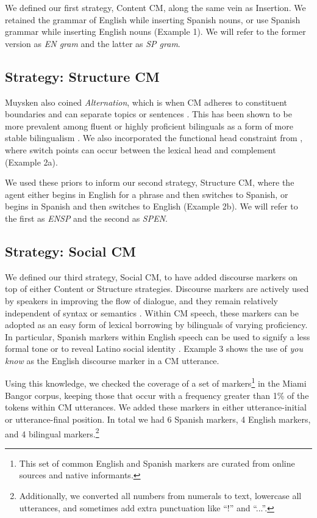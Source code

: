 \documentclass[11pt,a4paper]{article}
\begin{document}
We defined our first strategy, Content CM, along the same vein as Insertion.
We retained the grammar of English while inserting Spanish nouns, or use Spanish grammar while inserting English nouns (Example 1). 
We will refer to the former version as \textit{EN gram} and the latter as \textit{SP gram}.

\subsection{Strategy: Structure CM}

Muysken also coined \textit{Alternation}, which is when CM adheres to constituent boundaries \citep{sankoff1981formal} and can separate topics or sentences \citep{Ardila2005}. 
This has been shown to be more prevalent among fluent or highly proficient bilinguals as a form of more stable bilingualism \citep{Deuchar2007}. 
We also incorporated the functional head constraint from \citet{Belazi1994}, where switch points can occur between the lexical head and complement (Example 2a).

We used these priors to inform our second strategy, Structure CM, where the agent either begins in English for a phrase and then switches to Spanish, or begins in Spanish and then switches to English (Example 2b).
We will refer to the first as \textit{EN\textrightarrow SP} and the second as \textit{SP\textrightarrow EN}.

\subsection{Strategy: Social CM}

We defined our third strategy, Social CM, to have added discourse markers on top of either Content or Structure strategies.
Discourse markers are actively used by speakers in improving the flow of dialogue, and they remain relatively independent of syntax or semantics \citep{schiffrin1988discourse}.
Within CM speech, these markers can be adopted as an easy form of lexical borrowing by bilinguals of varying proficiency.
In particular, Spanish markers within English speech can be used to signify a less formal tone or to reveal Latino social identity \citep{Torres2011}.
Example 3 shows the use of \textit{you know} as the English discourse marker in a CM utterance.

Using this knowledge, we checked the coverage of a set of markers\footnote{This set of common English and Spanish markers are curated from online sources and native informants.} in the Miami Bangor corpus, keeping those that occur with a frequency greater than 1\% of the tokens within CM utterances. 
We added these markers in either utterance-initial or utterance-final position.
In total we had 6 Spanish markers, 4 English markers, and 4 bilingual markers.\footnote{Additionally, we converted all numbers from numerals to text, lowercase all utterances, and sometimes add extra punctuation like ``!'' and ``...''.}
\end{document}

